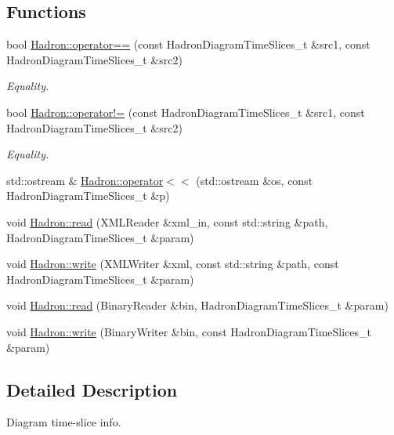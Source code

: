 \subsection*{Functions}
\begin{DoxyCompactItemize}
\item 
bool \mbox{\hyperlink{namespaceHadron_a9eb9233a6f185d9919fc72243524ee67}{Hadron\+::operator==}} (const Hadron\+Diagram\+Time\+Slices\+\_\+t \&src1, const Hadron\+Diagram\+Time\+Slices\+\_\+t \&src2)
\begin{DoxyCompactList}\small\item\em Equality. \end{DoxyCompactList}\item 
bool \mbox{\hyperlink{namespaceHadron_a795c74aad8519c0dc1b46c0e3c44f095}{Hadron\+::operator!=}} (const Hadron\+Diagram\+Time\+Slices\+\_\+t \&src1, const Hadron\+Diagram\+Time\+Slices\+\_\+t \&src2)
\begin{DoxyCompactList}\small\item\em Equality. \end{DoxyCompactList}\item 
std\+::ostream \& \mbox{\hyperlink{namespaceHadron_a7fed56ec5f5f96e9e160939d5b138184}{Hadron\+::operator$<$$<$}} (std\+::ostream \&os, const Hadron\+Diagram\+Time\+Slices\+\_\+t \&p)
\item 
void \mbox{\hyperlink{namespaceHadron_ae5cdeeff0a8ced82bfb5f5a46595faf8}{Hadron\+::read}} (X\+M\+L\+Reader \&xml\+\_\+in, const std\+::string \&path, Hadron\+Diagram\+Time\+Slices\+\_\+t \&param)
\item 
void \mbox{\hyperlink{namespaceHadron_ac03bbcefc730bcb21021dc5c45a1b365}{Hadron\+::write}} (X\+M\+L\+Writer \&xml, const std\+::string \&path, const Hadron\+Diagram\+Time\+Slices\+\_\+t \&param)
\item 
void \mbox{\hyperlink{namespaceHadron_a638347ea091d8f1823241f5551abb96e}{Hadron\+::read}} (Binary\+Reader \&bin, Hadron\+Diagram\+Time\+Slices\+\_\+t \&param)
\item 
void \mbox{\hyperlink{namespaceHadron_a70fe8dc6184653dde216306a0f4681d9}{Hadron\+::write}} (Binary\+Writer \&bin, const Hadron\+Diagram\+Time\+Slices\+\_\+t \&param)
\end{DoxyCompactItemize}


\subsection{Detailed Description}
Diagram time-\/slice info. 

